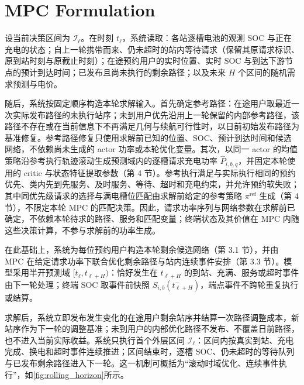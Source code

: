\documentclass[12pt,a4paper,UTF8]{ctexart}
\begin{document}
\section{MPC Formulation}

设当前决策区间为 $\mathcal I_\ell$。在时刻 $t_\ell$，系统读取：各站逐槽电池的观测 SOC 与正在充电的状态；自上一轮携带而来、仍未超时的站内等待请求（保留其原请求标识、原到站时刻与原截止时刻）；在途预约用户的实时位置、实时 SOC 与到达下游节点的预计到达时间；已发布且尚未执行的剩余路径；以及未来 $H$ 个区间的随机需求预测与电价。

随后，系统按固定顺序构造本轮求解输入。首先确定参考路径：在途用户取最近一次实际发布路径的未执行站序；未到用户优先沿用上一轮保留的内部参考路径，该路径不存在或在当前信息下不再满足几何与续航可行性时，以日前初始发布路径为基准修复。参考路径修复只使用求解前已知的位置、SOC、预计到达时间和候选网络，不依赖尚未生成的 actor 功率或本轮优化变量。其次，以同一 actor 的均值策略沿参考执行轨迹滚动生成预测域内的逐槽请求充电功率 $\widehat P_{i,b,q}$，并固定本轮使用的 critic 与状态特征提取参数（第 4 节）。参考执行满足与实际执行相同的预约优先、类内先到先服务、及时服务、等待、超时和充电约束，并允许预约软失败；其中同优先级请求的选择与满电槽位匹配由求解前给定的参考策略 $\pi^{\mathrm{ref}}$ 生成（第 4 节），不限定本轮 MPC 的匹配决策。因此，请求功率序列与网络参数在求解前已确定，不依赖本轮待求的路径、服务和匹配变量；终端状态及其价值在 MPC 内随这些决策计算，不参与求解前的功率生成。

在此基础上，系统为每位预约用户构造本轮剩余候选网络（第 3.1 节），并由 MPC 在给定请求功率下联合优化剩余路径与站内连续事件安排（第 3.3 节）。模型采用半开预测域 $[t_\ell,t_{\ell+H})$：恰好发生在 $t_{\ell+H}$ 的到站、充满、服务或超时事件由下一轮处理；终端 SOC 取事件前快照 $S_{i,b}(t_{\ell+H}^{-})$，端点事件不跨轮重复执行或结算。

求解后，系统立即发布发生变化的在途用户剩余站序并结算一次路径调整成本，新站序作为下一轮的调整基准；未到用户的内部优化路径不发布、不覆盖日前路径，也不进入当前实际收益。系统只执行首个外层区间 $\mathcal I_\ell$：区间内按真实到站、充电完成、换电和超时事件连续推进；区间结束时，逐槽 SOC、仍未超时的等待队列与已发布剩余路径进入下一轮。这一机制可概括为“滚动时域优化、连续事件执行”，如\autoref{fig:rolling_horizon}所示。
\end{document}
